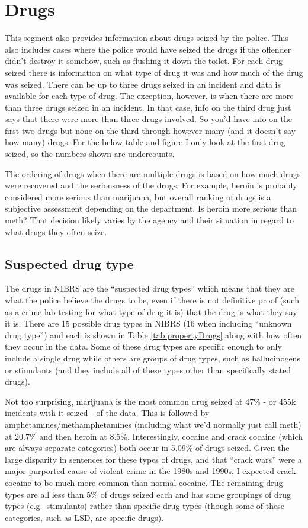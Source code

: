 \documentclass[
]{krantz}
\begin{document}
\section{Drugs}\label{drugs}

This segment also provides information about drugs seized by
the police. This also includes cases where the police would
have seized the drugs if the offender didn't destroy it
somehow, such as flushing it down the toilet. For each drug
seized there is information on what type of drug it was and
how much of the drug was seized. There can be up to three
drugs seized in an incident and data is available for each
type of drug. The exception, however, is when there are more
than three drugs seized in an incident. In that case, info
on the third drug just says that there were more than three
drugs involved. So you'd have info on the first two drugs
but none on the third through however many (and it doesn't
say how many) drugs. For the below table and figure I only
look at the first drug seized, so the numbers shown are
undercounts.

The ordering of drugs when there are multiple drugs is based
on how much drugs were recovered and the seriousness of the
drugs. For example, heroin is probably considered more
serious than marijuana, but overall ranking of drugs is a
subjective assessment depending on the department. Is heroin
more serious than meth? That decision likely varies by the
agency and their situation in regard to what drugs they
often seize.

\subsection{Suspected drug type}\label{suspected-drug-type}

The drugs in NIBRS are the ``suspected drug types'' which
means that they are what the police believe the drugs to be,
even if there is not definitive proof (such as a crime lab
testing for what type of drug it is) that the drug is what
they say it is. There are 15 possible drug types in NIBRS
(16 when including ``unknown drug type'') and each is shown
in Table \ref{tab:propertyDrugs} along with how often they
occur in the data. Some of these drug types are specific
enough to only include a single drug while others are groups
of drug types, such as hallucinogens or stimulants (and they
include all of these types other than specifically stated
drugs).

Not too surprising, marijuana is the most common drug seized
at 47\% - or 455k incidents with it seized - of the data.
This is followed by amphetamines/methamphetamines (including
what we'd normally just call meth) at 20.7\% and then heroin
at 8.5\%. Interestingly, cocaine and crack cocaine (which
are always separate categories) both occur in 5.09\% of
drugs seized. Given the large disparity in sentences for
these types of drugs, and that ``crack wars'' were a major
purported cause of violent crime in the 1980s and 1990s, I
expected crack cocaine to be much more common than normal
cocaine. The remaining drug types are all less than 5\% of
drugs seized each and has some groupings of drug types
(e.g.~stimulants) rather than specific drug types (though
some of these categories, such as LSD, are specific drugs).
\end{document}
